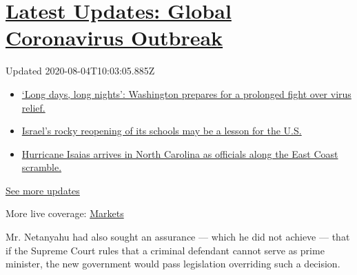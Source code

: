 \hypertarget{latest-updates-global-coronavirus-outbreak}{%
\section{\texorpdfstring{\href{https://www.nytimes3xbfgragh.onion/2020/08/04/world/coronavirus-covid-19.html?action=click\&pgtype=Article\&state=default\&region=MAIN_CONTENT_1\&context=storylines_live_updates}{Latest
Updates: Global Coronavirus
Outbreak}}{Latest Updates: Global Coronavirus Outbreak}}\label{latest-updates-global-coronavirus-outbreak}}

Updated 2020-08-04T10:03:05.885Z

\begin{itemize}
\tightlist
\item
  \href{https://www.nytimes3xbfgragh.onion/2020/08/04/world/coronavirus-covid-19.html?action=click\&pgtype=Article\&state=default\&region=MAIN_CONTENT_1\&context=storylines_live_updates\#link-6b644638}{`Long
  days, long nights': Washington prepares for a prolonged fight over
  virus relief.}
\item
  \href{https://www.nytimes3xbfgragh.onion/2020/08/04/world/coronavirus-covid-19.html?action=click\&pgtype=Article\&state=default\&region=MAIN_CONTENT_1\&context=storylines_live_updates\#link-7af9fca0}{Israel's
  rocky reopening of its schools may be a lesson for the U.S.}
\item
  \href{https://www.nytimes3xbfgragh.onion/2020/08/04/world/coronavirus-covid-19.html?action=click\&pgtype=Article\&state=default\&region=MAIN_CONTENT_1\&context=storylines_live_updates\#link-33bf9168}{Hurricane
  Isaias arrives in North Carolina as officials along the East Coast
  scramble.}
\end{itemize}

\href{https://www.nytimes3xbfgragh.onion/2020/08/04/world/coronavirus-covid-19.html?action=click\&pgtype=Article\&state=default\&region=MAIN_CONTENT_1\&context=storylines_live_updates}{See
more updates}

More live coverage:
\href{https://www.nytimes3xbfgragh.onion/live/2020/08/04/business/stock-market-today-coronavirus?action=click\&pgtype=Article\&state=default\&region=MAIN_CONTENT_1\&context=storylines_live_updates}{Markets}

Mr. Netanyahu had also sought an assurance --- which he did not achieve
--- that if the Supreme Court rules that a criminal defendant cannot
serve as prime minister, the new government would pass legislation
overriding such a decision.

